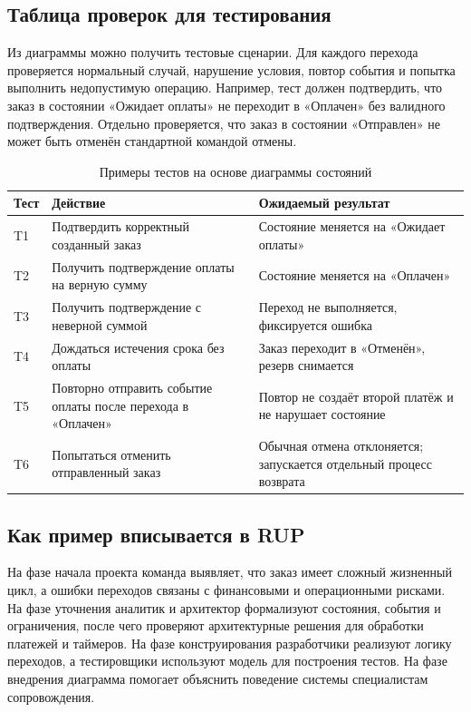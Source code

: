 \documentclass[essay,paper]{pmk-graduate}
\begin{document}
\subsection{Таблица проверок для тестирования}

Из диаграммы можно получить тестовые сценарии. Для каждого перехода проверяется нормальный случай, нарушение условия, повтор события и попытка выполнить недопустимую операцию. Например, тест должен подтвердить, что заказ в состоянии «Ожидает оплаты» не переходит в «Оплачен» без валидного подтверждения. Отдельно проверяется, что заказ в состоянии «Отправлен» не может быть отменён стандартной командой отмены.

\begin{table}[ht]
\centering
\caption{Примеры тестов на основе диаграммы состояний}
\begin{tabularx}{\textwidth}{|p{3.1cm}|X|X|}
\hline
\textbf{Тест} & \textbf{Действие} & \textbf{Ожидаемый результат} \\ \hline
T1 & Подтвердить корректный созданный заказ & Состояние меняется на «Ожидает оплаты» \\ \hline
T2 & Получить подтверждение оплаты на верную сумму & Состояние меняется на «Оплачен» \\ \hline
T3 & Получить подтверждение с неверной суммой & Переход не выполняется, фиксируется ошибка \\ \hline
T4 & Дождаться истечения срока без оплаты & Заказ переходит в «Отменён», резерв снимается \\ \hline
T5 & Повторно отправить событие оплаты после перехода в «Оплачен» & Повтор не создаёт второй платёж и не нарушает состояние \\ \hline
T6 & Попытаться отменить отправленный заказ & Обычная отмена отклоняется; запускается отдельный процесс возврата \\ \hline
\end{tabularx}
\end{table}

\subsection{Как пример вписывается в RUP}

На фазе начала проекта команда выявляет, что заказ имеет сложный жизненный цикл, а ошибки переходов связаны с финансовыми и операционными рисками. На фазе уточнения аналитик и архитектор формализуют состояния, события и ограничения, после чего проверяют архитектурные решения для обработки платежей и таймеров. На фазе конструирования разработчики реализуют логику переходов, а тестировщики используют модель для построения тестов. На фазе внедрения диаграмма помогает объяснить поведение системы специалистам сопровождения.
\end{document}
